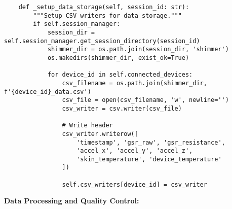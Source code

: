 \documentclass[11pt,a4paper]{article}
\begin{document}
\begin{verbatim}
    def _setup_data_storage(self, session_id: str):
        """Setup CSV writers for data storage."""
        if self.session_manager:
            session_dir = self.session_manager.get_session_directory(session_id)
            shimmer_dir = os.path.join(session_dir, 'shimmer')
            os.makedirs(shimmer_dir, exist_ok=True)

            for device_id in self.connected_devices:
                csv_filename = os.path.join(shimmer_dir, f'{device_id}_data.csv')
                csv_file = open(csv_filename, 'w', newline='')
                csv_writer = csv.writer(csv_file)

                # Write header
                csv_writer.writerow([
                    'timestamp', 'gsr_raw', 'gsr_resistance',
                    'accel_x', 'accel_y', 'accel_z',
                    'skin_temperature', 'device_temperature'
                ])

                self.csv_writers[device_id] = csv_writer
\end{verbatim}

\textbf{Data Processing and Quality Control:}
\end{document}
